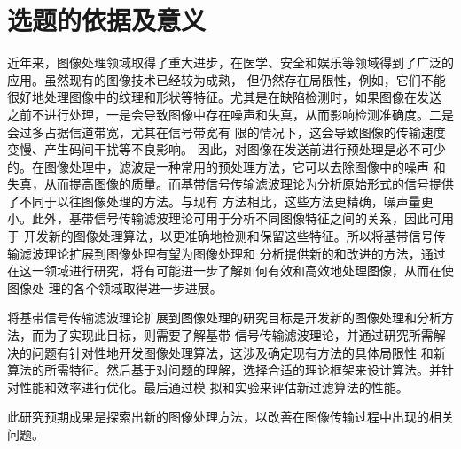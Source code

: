 %
%
%
%

\section{选题的依据及意义}

近年来，图像处理领域取得了重大进步，在医学、安全和娱乐等领域得到了广泛的应用。虽然现有的图像技术已经较为成熟，
但仍然存在局限性，例如，它们不能很好地处理图像中的纹理和形状等特征。尤其是在缺陷检测时，如果图像在发送
之前不进行处理，一是会导致图像中存在噪声和失真，从而影响检测准确度。二是会过多占据信道带宽，尤其在信号带宽有
限的情况下，这会导致图像的传输速度变慢、产生码间干扰等不良影响。
因此，对图像在发送前进行预处理是必不可少的。在图像处理中，滤波是一种常用的预处理方法，它可以去除图像中的噪声
和失真，从而提高图像的质量。而基带信号传输滤波理论为分析原始形式的信号提供了不同于以往图像处理的方法。与现有
方法相比，这些方法更精确，噪声量更小。此外，基带信号传输滤波理论可用于分析不同图像特征之间的关系，因此可用于
开发新的图像处理算法，以更准确地检测和保留这些特征。所以将基带信号传输滤波理论扩展到图像处理有望为图像处理和
分析提供新的和改进的方法，通过在这一领域进行研究，将有可能进一步了解如何有效和高效地处理图像，从而在使图像处
理的各个领域取得进一步进展。

将基带信号传输滤波理论扩展到图像处理的研究目标是开发新的图像处理和分析方法，而为了实现此目标，则需要了解基带
信号传输滤波理论，并通过研究所需解决的问题有针对性地开发图像处理算法，这涉及确定现有方法的具体局限性
和新算法的所需特征。然后基于对问题的理解，选择合适的理论框架来设计算法。并针对性能和效率进行优化。最后通过模
拟和实验来评估新过滤算法的性能。

此研究预期成果是探索出新的图像处理方法，以改善在图像传输过程中出现的相关问题。






